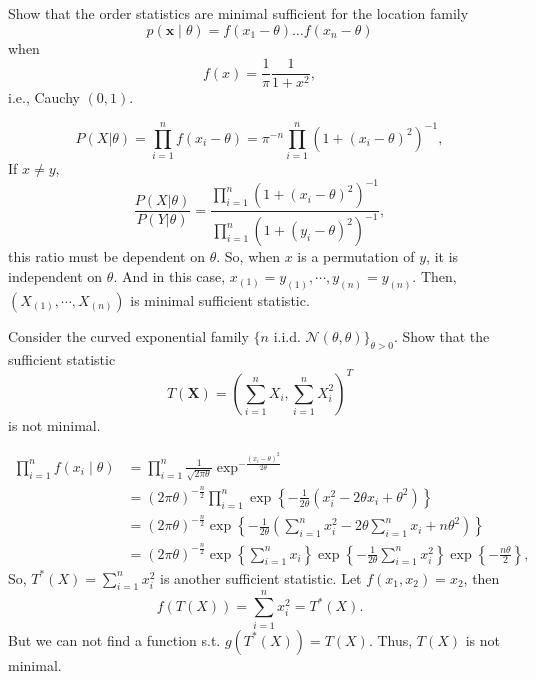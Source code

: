 \begin{exercise}
    Show that the order statistics are minimal sufficient for the location family
    \[
        p(\mathbf{x} \mid \theta)=f\left(x_{1}-\theta\right) \ldots f\left(x_{n}-\theta\right)
    \]
    when
    \[
        f(x)=\frac{1}{\pi} \frac{1}{1+x^{2}},
    \]
    i.e., Cauchy \((0,1)\). 
\end{exercise}

\begin{solution}
    \[
        P(X|\theta)=\prod_{i=1}^nf(x_i-\theta)=\pi^{-n}\prod_{i=1}^n(1+(x_i-\theta)^2)^{-1}, 
    \]
    If $x\neq y$, 
    \[
        \frac{P(X|\theta)}{P(Y|\theta)}=\frac{\prod_{i=1}^n(1+(x_i-\theta)^2)^{-1}}{\prod_{i=1}^n(1+(y_i-\theta)^2)^{-1}}, 
    \]
    this ratio must be dependent on $\theta$. So, when $x$ is a permutation of $y$, it is independent on $\theta$. And in this case, $x_{(1)}=y_{(1)}, \cdots, y_{(n)}=y_{(n)}$. Then, $(X_{(1)}, \cdots, X_{(n)})$ is minimal sufficient statistic. 
\end{solution}

\begin{exercise}
    Consider the curved exponential family \(\{n \text { i.i.d. } \mathcal{N}(\theta, \theta)\}_{\theta>0}\). Show that the sufficient statistic
    \[
        T(\mathbf{X})=\left(\sum_{i=1}^{n} X_{i}, \sum_{i=1}^{n} X_{i}^{2}\right)^T
    \]
    is not minimal. 
\end{exercise}

\begin{solution}
    \[
        \begin{aligned} 
            \prod_{i=1}^{n} f\left(x_{i} \mid \theta\right) &=\prod_{i=1}^{n} \frac{1}{\sqrt{2 \pi \theta}} \exp^{-\frac{\left(x_{i}-\theta\right)^{2}}{2 \theta}} \\ &=(2 \pi \theta)^{-\frac{n}{2}} \prod_{i=1}^{n} \exp \left\{-\frac{1}{2 \theta}\left(x_{i}^{2}-2 \theta x_{i}+\theta^{2}\right)\right\} \\ &=(2 \pi \theta)^{-\frac{n}{2}} \exp \left\{-\frac{1}{2 \theta}\left(\sum_{i=1}^{n} x_{i}^{2}-2 \theta \sum_{i=1}^{n} x_{i}+n \theta^{2}\right)\right\} \\ &=(2 \pi \theta)^{-\frac{n}{2}} \exp \left\{\sum_{i=1}^{n} x_{i}\right\} \exp \left\{-\frac{1}{2 \theta} \sum_{i=1}^{n} x_{i}^{2}\right\} \exp \left\{-\frac{n \theta}{2}\right\}, 
        \end{aligned}
    \]
    So, $T^*(X)=\sum_{i=1}^nx_i^2$ is another sufficient statistic. Let $f(x_1,x_2)=x_2$, then 
    \[
        f(T(X))=\sum_{i=1}^nx_i^2 = T^*(X). 
    \]
    But we can not find a function s.t. $g(T^*(X))=T(X)$. Thus, $T(X)$ is not minimal. 
\end{solution}

